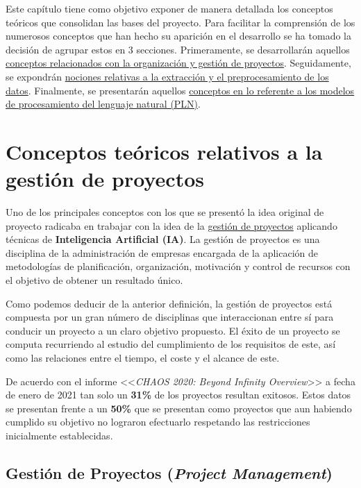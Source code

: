 
Este capítulo tiene como objetivo exponer de manera detallada los conceptos teóricos que consolidan las bases del proyecto. Para facilitar la comprensión de los numerosos conceptos que han hecho su aparición en el desarrollo se ha tomado la decisión de agrupar estos en 3 secciones. Primeramente, se desarrollarán aquellos \hyperref[sec:gestionproyectos]{conceptos relacionados con la organización y gestión de proyectos}. Seguidamente, se expondrán \hyperref[sec:conceptosextraccionprocesamiento]{nociones relativas a la extracción y el preprocesamiento de los datos}. Finalmente, se presentarán aquellos \hyperref[sec:procesamientodatos]{conceptos en lo referente a los modelos de procesamiento del lenguaje natural (PLN)}.

\section{Conceptos teóricos relativos a la gestión de proyectos} \label{sec:conceptosgestionproyectos}

Uno de los principales conceptos con los que se presentó la idea original de proyecto radicaba en trabajar con la idea de la \hyperref[sec:gestionproyectos]{gestión de proyectos} aplicando técnicas de \textbf{Inteligencia Artificial (IA)}. La gestión de proyectos es una disciplina de la administración de empresas encargada de la aplicación de metodologías de planificación, organización, motivación y control de recursos con el objetivo de obtener un resultado único.

Como podemos deducir de la anterior definición, la gestión de proyectos está compuesta por un gran número de disciplinas que interaccionan entre sí para conducir un proyecto a un claro objetivo propuesto. El éxito de un proyecto se computa recurriendo al estudio del cumplimiento de los requisitos de este, así como las relaciones entre el tiempo, el coste y el alcance de este.

De acuerdo con el informe <<\emph{CHAOS 2020: Beyond Infinity Overview}>> \cite{ct:portman_project_success} a fecha de enero de 2021 tan solo un \textbf{31\%} de los proyectos resultan exitosos. Estos datos se presentan frente a un \textbf{50\%} que se presentan como proyectos que aun habiendo cumplido su objetivo no lograron efectuarlo respetando las restricciones inicialmente establecidas.

\subsection{Gestión de Proyectos (\emph{Project Management})} \label{sec:gestionproyectos}

